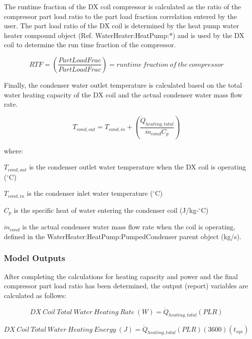 The runtime fraction of the DX coil compressor is calculated as the ratio of the compressor part load ratio to the part load fraction correlation entered by the user. The part load ratio of the DX coil is determined by the heat pump water heater compound object (Ref. WaterHeater:HeatPump:*) and is used by the DX coil to determine the run time fraction of the compressor.

\begin{equation}
RTF = \left( \frac{PartLoadFrac}{PartLoadFrac} \right) = runtime~fraction~of~the~compressor
\end{equation}

Finally, the condenser water outlet temperature is calculated based on the total water heating capacity of the DX coil and the actual condenser water mass flow rate.

\begin{equation}
{T_{cond,out}} = {T_{cond,in}} + \left( {\frac{\dot{Q}_{heating,total}}{{\dot{m}_{cond}}{C_p}}} \right)
\end{equation}

where:

\({T_{cond,out}}\) is the condenser outlet water temperature when the DX coil is operating (\(^{\circ}\)C)

\({T_{cond,in}}\) is the condenser inlet water temperature (\(^{\circ}\)C)

\({C_p}\) is the specific heat of water entering the condenser coil (J/kg-\(^{\circ}\)C)

\(\dot{m}_{cond}\) is the actual condenser water mass flow rate when the coil is operating, defined in the WaterHeater:HeatPump:PumpedCondenser parent object (kg/s).

\subsubsection{Model Outputs}\label{model-outputs-1}

After completing the calculations for heating capacity and power and the final compressor part load ratio has been determined, the output (report) variables are calculated as follows:

\begin{equation}
DX~Coil~Total~Water~Heating~Rate~(W) = {\dot{Q}_{heating,total}}\left( {PLR} \right)
\end{equation}

\begin{equation}
DX~Coil~Total~Water~Heating~Energy~(J) = {\dot{Q}_{heating,total}}\left( {PLR} \right)\left( {3600} \right)\left( {{t_{sys}}} \right)
\end{equation}

